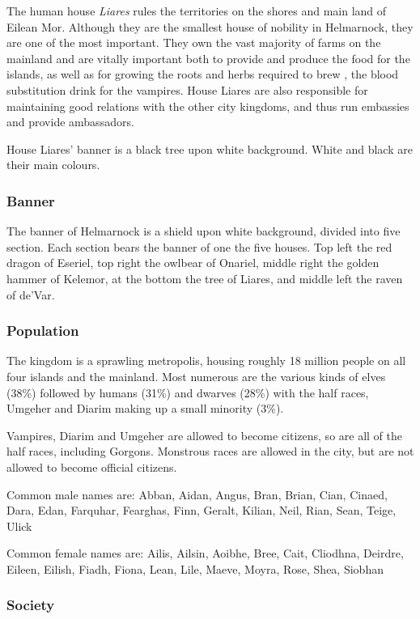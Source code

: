 The human house \emph{Liares} rules the territories on the shores and main
land of Eilean Mor. Although they are the smallest house of nobility in
Helmarnock, they are one of the most important. They own the vast majority of
farms on the mainland and are vitally important both to provide and produce
the food for the islands, as well as for growing the roots and herbs required
to brew , the blood substitution drink for the
vampires. House Liares are also responsible for maintaining good relations
with the other city kingdoms, and thus run embassies and provide ambassadors.

House Liares' banner is a black tree upon white background. White and black
are their main colours.

\subsubsection{Banner}

The banner of Helmarnock is a shield upon white background, divided into five
section. Each section bears the banner of one the five houses. Top left the
red dragon of Eseriel, top right the owlbear of Onariel, middle right the
golden hammer of Kelemor, at the bottom the tree of Liares, and middle left
the raven of de'Var.

\subsubsection{Population}

The kingdom is a sprawling metropolis, housing roughly 18 million people on
all four islands and the mainland. Most numerous are the various kinds of
elves (38\%) followed by humans (31\%) and dwarves (28\%) with the half
races, Umgeher and Diarim making up a small minority (3\%).

Vampires, Diarim and Umgeher are allowed to become citizens, so are all of the
half races, including Gorgons. Monstrous races are allowed in the city, but
are not allowed to become official citizens.

Common male names are: Abban, Aidan, Angus, Bran, Brian, Cian, Cinaed, Dara,
Edan, Farquhar, Fearghas, Finn, Geralt, Kilian, Neil, Rian, Sean, Teige, Ulick

Common female names are: Ailis, Ailsin, Aoibhe, Bree, Cait, Cliodhna, Deirdre,
Eileen, Eilish, Fiadh, Fiona, Lean, Lile, Maeve, Moyra, Rose, Shea, Siobhan

\subsubsection{Society}

